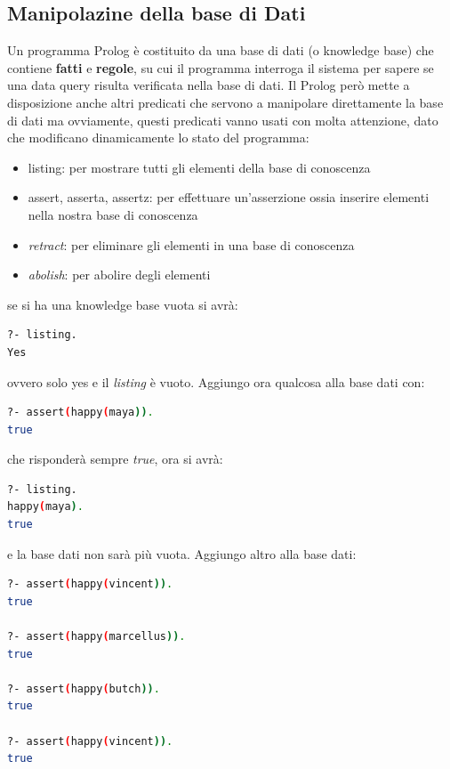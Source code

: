 \documentclass[a4paper]{report}
\begin{document}
\subsection{Manipolazine della base di Dati}
Un programma Prolog è costituito da una base di dati (o knowledge base) che contiene \textbf{fatti} e \textbf{regole},
su cui il programma interroga il sistema per sapere se una data query risulta verificata nella base di dati.\newline
Il Prolog però mette a disposizione anche altri predicati che servono a manipolare direttamente la base di dati ma ovviamente,
questi predicati vanno usati con molta attenzione, dato che modificano dinamicamente lo stato del programma:
\begin{itemize}
\item listing: per mostrare tutti gli elementi della base di conoscenza
\item assert, asserta, assertz: per effettuare un'asserzione ossia inserire elementi nella nostra base di conoscenza
\item \textit{retract}: per eliminare gli elementi in una base di conoscenza
\item \textit{abolish}: per abolire degli elementi
\end{itemize}
se si ha una knowledge base vuota si avrà:
\begin{shaded}
\begin{lstlisting}[language=bash]
?- listing.
Yes
\end{lstlisting}
\end{shaded}
ovvero solo yes e il \textit{listing} è vuoto.\newline
Aggiungo ora qualcosa alla base dati con:
\begin{shaded}
\begin{lstlisting}[language=bash]
?- assert(happy(maya)).
true
\end{lstlisting}
\end{shaded}
che risponderà sempre \textit{true}, ora si avrà:
\begin{shaded}
\begin{lstlisting}[language=bash]
?- listing.
happy(maya).
true
\end{lstlisting}
\end{shaded}
e la base dati non sarà più vuota.\newline
Aggiungo altro alla base dati:
\begin{shaded}
\begin{lstlisting}[language=bash]
?- assert(happy(vincent)).
true

?- assert(happy(marcellus)).
true

?- assert(happy(butch)).
true

?- assert(happy(vincent)).
true
\end{lstlisting}
\end{shaded}
\end{document}
